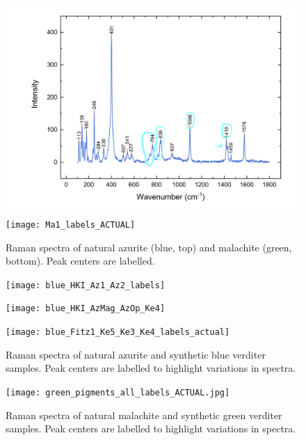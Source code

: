 \begin{figure}[H]
\centering
\begin{minipage}[t]{\linewidth}
  \centering
  \includegraphics[width=0.9\linewidth]{az1_blue_withlabels}
\hfill
\texttt{[image: Ma1\_labels\_ACTUAL]}
\hfill
\end{minipage}
\caption[Raman spectra of natural azurite and malachite, peak centers labelled.]{Raman spectra of natural azurite (blue, top) and malachite (green, bottom). Peak centers are labelled.}
\label{fig:label_raman}
\end{figure}

\begin{figure}[H]
\centering
  \texttt{[image: blue\_HKI\_Az1\_Az2\_labels]}
\label{fig:blue_comparison1}
\end{figure}

\begin{figure}[H]
  \centering
  \texttt{[image: blue\_HKI\_AzMag\_AzOp\_Ke4]}
\label{fig:blue_comparison2}
\end{figure}

\begin{figure}[H]
  \centering
  \texttt{[image: blue\_Fitz1\_Ke5\_Ke3\_Ke4\_labels\_actual]}
\caption[Raman spectra of blue samples, peak centers labelled.]{Raman spectra of natural azurite and synthetic blue verditer samples. Peak centers are labelled to highlight variations in spectra.}
\label{fig:blue_comparison3}
\end{figure}

\begin{figure}[H]
\centering
  \texttt{[image: green\_pigments\_all\_labels\_ACTUAL.jpg]}
\caption[Raman spectra of green samples, peak centers labelled.]{Raman spectra of natural malachite and synthetic green verditer samples. Peak centers are labelled to highlight variations in spectra.}
\label{fig:green_comparison}
\end{figure}

